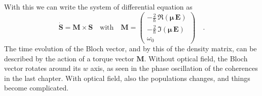 With this we can write the system of differential equation as 
\begin{equation}
 \dot{\boldsymbol{S}} = \boldsymbol{M}   \times \boldsymbol{S} 
 \quad \text{with} \quad 
 \boldsymbol{M}  = 
 \begin{pmatrix}
 -\frac{2}{\hbar} \, \Re ( \boldsymbol{\mu} \, \boldsymbol{E} ) \\
 - \frac{2}{\hbar} \, \Im ( \boldsymbol{\mu} \, \boldsymbol{E} ) \\
  \omega_0
 \end{pmatrix} \quad .
\end{equation}
The time evolution of the Bloch vector, and by this of the density matrix, can be described by the action of a torque vector $\boldsymbol{M}$. Without optical field, the Bloch vector rotates around its $w$ axis, as seen in the phase oscillation of the coherences in the last chapter. With optical field, also the populations changes, and things become complicated.

